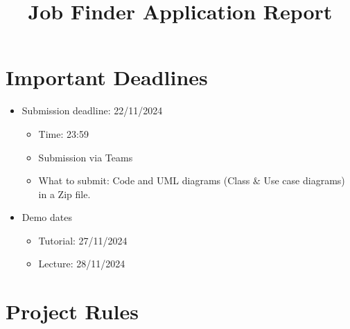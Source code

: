 \documentclass{article}
\title{Job Finder Application Report}
\date{}
\begin{document}
\maketitle






\section*{Important Deadlines}


\begin{itemize}


    \item Submission deadline: 22/11/2024


    \begin{itemize}


        \item Time: 23:59


        \item Submission via Teams


        \item What to submit: Code and UML diagrams (Class \& Use case diagrams) in a Zip file.


    \end{itemize}


    \item Demo dates


    \begin{itemize}


        \item Tutorial: 27/11/2024


        \item Lecture: 28/11/2024


    \end{itemize}


\end{itemize}






\section*{Project Rules}
\end{document}
